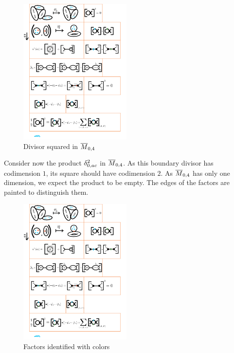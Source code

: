\documentclass[12pt]{memoir}
\begin{document}
\begin{Ex}
    \begin{figure}[h!]
        \centering
        \includegraphics[width=0.5\textwidth, trim= 13cm 9.8cm 2cm 15.8cm,clip]{../figs/FigsDNnotability2.pdf}
        \caption{Divisor squared in $\overline M_{0,4}$}
        \label{fig:divisor-squared-M04}
    \end{figure} 
    Consider now the product $\delta_{0,{ac}}^2$ in $\overline{M}_{0,4}$. As this boundary divisor has codimension $1$, its square should have codimension $2$. As $\overline{M}_{0,4}$ has only one dimension, we expect the product to be empty. The edges of the factors are painted to distinguish them.
    \begin{figure}[h!]
        \centering
        \includegraphics[width=0.5\textwidth, trim= 12.8cm 17.8cm 1.3cm 8cm,clip]{../figs/FigsDNnotability2.pdf}
        \caption{Factors identified with colors}
        \label{fig:divisor-squared-2-M04}

\end{figure}
\end{Ex}
\end{document}
